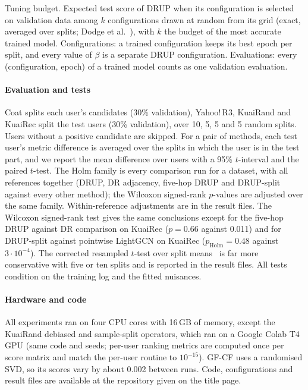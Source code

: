 \documentclass[preprint,review,12pt,authoryear]{elsarticle}
\theoremstyle{definition}
\begin{document}
\begin{table}[h]\centering\footnotesize
\caption{Tuning budget. Expected test score of DRUP when its configuration is
selected on validation data among $k$ configurations drawn at random from its
grid (exact, averaged over splits; Dodge et al.~\citep{dodge2019showyourwork}), with
$k$ the budget of the most accurate trained model. Configurations: a trained
configuration keeps its best epoch per split, and every value of $\beta$ is a
separate DRUP configuration. Evaluations: every (configuration, epoch) of a
trained model counts as one validation evaluation.}\label{tab:budget}
\begin{adjustbox}{max width=\textwidth}

\end{adjustbox}
\end{table}

\paragraph{Evaluation and tests}
Coat splits each user's candidates (30\% validation), Yahoo!\,R3, KuaiRand and
KuaiRec split the test users (30\% validation), over 10, 5, 5 and 5 random splits.
Users without a positive candidate are skipped. For a pair of methods, each
test user's metric difference is averaged over the splits in which the user
is in the test part, and we report the mean difference over users with a
95\% $t$-interval and the paired $t$-test. The Holm family is every comparison
run for a dataset, with all references together (DRUP, DR adjacency, five-hop
DRUP and DRUP-split against every other method); the Wilcoxon signed-rank
$p$-values are adjusted over the same family. Within-reference adjustments are
in the result files. The Wilcoxon signed-rank test gives the same conclusions except for the
five-hop DRUP against DR comparison on KuaiRec ($p=0.66$ against 0.011) and for
DRUP-split against pointwise LightGCN on KuaiRec ($p_{\mathrm{Holm}}=0.48$ against $3\cdot10^{-4}$). The
corrected resampled $t$-test over split means~\citep{nadeau2003} is far more
conservative with five or ten splits and is reported in the result files.
All tests condition on the training log and the fitted nuisances.

\paragraph{Hardware and code}
All experiments ran on four CPU cores with 16\,GB of memory, except the KuaiRand
debiased and sample-split operators, which ran on a Google Colab T4 GPU (same code and
seeds; per-user ranking metrics are computed once per score matrix and match the
per-user routine to $10^{-15}$). GF-CF uses a randomised SVD, so its scores vary by
about 0.002 between runs.
Code, configurations and result files are available at the repository given
on the title page.
\end{document}
